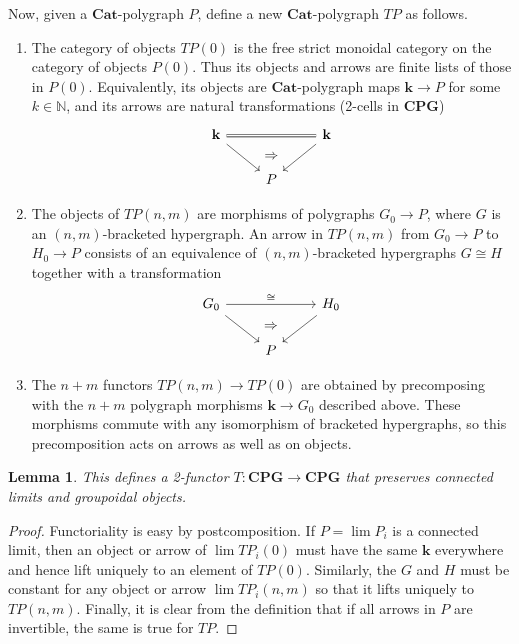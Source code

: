 \documentclass{article}
\newtheorem{lem}[thm]{Lemma}
\theoremstyle{definition}
\theoremstyle{remark}
\def\Cat{\ensuremath{\mathbf{Cat}}}
\def\cpg{\ensuremath{\mathbf{CPG}}\xspace}
\def\N{\mathbb{N}}
\begin{document}
Now, given a \Cat-polygraph $P$, define a new \Cat-polygraph $T P$ as follows.
\begin{enumerate}
\item The category of objects $T P(0)$ is the free strict monoidal category on the category of objects $P(0)$.
  Thus its objects and arrows are finite lists of those in $P(0)$.
  Equivalently, its objects are \Cat-polygraph maps $\mathbf{k}\to P$ for some $k\in\N$, and its arrows are natural transformations (2-cells in \cpg)
  \[
  \begin{tikzcd}
    \mathbf{k} \ar[rr,equals] \ar[dr] & ~ \ar[d,phantom,"\Rightarrow"] & \mathbf{k} \ar[dl] \\ & P
  \end{tikzcd}
  \]
\item The objects of $TP(n,m)$ are morphisms of polygraphs $G_0\to P$, where $G$ is an $(n,m)$-bracketed hypergraph.
  An arrow in $TP(n,m)$ from $G_0\to P$ to $H_0\to P$ consists of an equivalence of $(n,m)$-bracketed hypergraphs $G\cong H$ together with a transformation
  \[
  \begin{tikzcd}
    G_0 \ar[rr,"\cong"] \ar[dr] & ~ \ar[d,phantom,"\Rightarrow"] & H_0 \ar[dl] \\ & P
  \end{tikzcd}
  \]
\item The $n+m$ functors $TP(n,m) \to TP(0)$ are obtained by precomposing with the $n+m$ polygraph morphisms $\mathbf{k}\to G_0$ described above.
  These morphisms commute with any isomorphism of bracketed hypergraphs, so this precomposition acts on arrows as well as on objects.
\end{enumerate}

\begin{lem}
  This defines a 2-functor $T:\cpg\to\cpg$ that preserves connected limits and groupoidal objects.
\end{lem}
\begin{proof}
  Functoriality is easy by postcomposition.
  If $P = \lim P_i$ is a connected limit, then an object or arrow of $\lim T P_i(0)$ must have the same $\mathbf{k}$ everywhere and hence lift uniquely to an element of $T P(0)$.
  Similarly, the $G$ and $H$ must be constant for any object or arrow $\lim T P_i(n,m)$ so that it lifts uniquely to $T P (n,m)$.
  Finally, it is clear from the definition that if all arrows in $P$ are invertible, the same is true for $TP$.
\end{proof}
\end{document}
